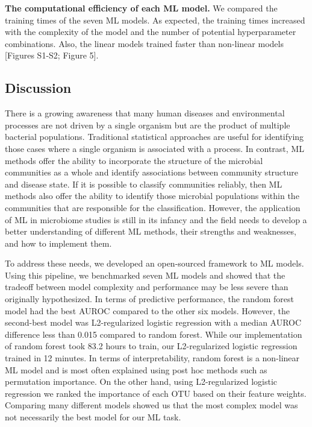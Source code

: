 \documentclass[11pt,]{article}
\begin{document}
\textbf{The computational efficiency of each ML model.} We compared the
training times of the seven ML models. As expected, the training times
increased with the complexity of the model and the number of potential
hyperparameter combinations. Also, the linear models trained faster than
non-linear models {[}Figures S1-S2; Figure 5{]}.

\subsection{Discussion}\label{discussion}

There is a growing awareness that many human diseases and environmental
processes are not driven by a single organism but are the product of
multiple bacterial populations. Traditional statistical approaches are
useful for identifying those cases where a single organism is associated
with a process. In contrast, ML methods offer the ability to incorporate
the structure of the microbial communities as a whole and identify
associations between community structure and disease state. If it is
possible to classify communities reliably, then ML methods also offer
the ability to identify those microbial populations within the
communities that are responsible for the classification. However, the
application of ML in microbiome studies is still in its infancy and the
field needs to develop a better understanding of different ML methods,
their strengths and weaknesses, and how to implement them.

To address these needs, we developed an open-sourced framework to ML
models. Using this pipeline, we benchmarked seven ML models and showed
that the tradeoff between model complexity and performance may be less
severe than originally hypothesized. In terms of predictive performance,
the random forest model had the best AUROC compared to the other six
models. However, the second-best model was L2-regularized logistic
regression with a median AUROC difference less than 0.015 compared to
random forest. While our implementation of random forest took 83.2 hours
to train, our L2-regularized logistic regression trained in 12 minutes.
In terms of interpretability, random forest is a non-linear ML model and
is most often explained using post hoc methods such as permutation
importance. On the other hand, using L2-regularized logistic regression
we ranked the importance of each OTU based on their feature weights.
Comparing many different models showed us that the most complex model
was not necessarily the best model for our ML task.
\end{document}
